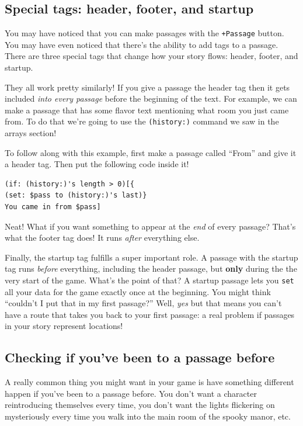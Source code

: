 \documentclass[a5paper,11pt]{article}
\begin{document}
\subsection{Special tags: header, footer, and startup}
You may have noticed that you can make passages with the \verb"+Passage" button. You may have even noticed that there's the ability to add tags to a passage. There are three special tags that change how your story flows: header, footer, and startup.

They all work pretty similarly! If you give a passage the header tag then it gets included \emph{into every passage} before the beginning of the text. For example, we can make a passage that has some flavor text mentioning what room you just came from. To do that we're going to use the \verb|(history:)| command we saw in the arrays section!

To follow along with this example, first make a passage called ``From'' and give it a header tag. Then put the following code inside it!
\begin{verbatim}
(if: (history:)'s length > 0)[{
(set: $pass to (history:)'s last)}
You came in from $pass]

\end{verbatim}

Neat! What if you want something to appear at the \emph{end} of every passage? That's what the footer tag does! It runs \emph{after} everything else.

Finally, the startup tag fulfills a super important role. A passage with the startup tag runs \emph{before} everything, including the header passage, but \textbf{only} during the the very start of the game. What's the point of that? A startup passage lets you \verb|set| all your data for the game exactly once at the beginning. You might think ``couldn't I put that in my first passage?'' Well, \emph{yes} but that means you can't have a route that takes you back to your first passage: a real problem if passages in your story represent locations!


\subsection{Checking if you've been to a passage before}
A really common thing you might want in your game is have something different happen if you've been to a passage before. You don't want a character reintroducing themselves every time, you don't want the lights flickering on mysteriously every time you walk into the main room of the spooky manor, etc.
\end{document}
